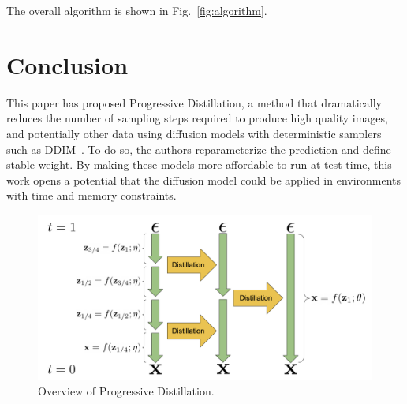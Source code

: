 \documentclass[10pt,twocolumn,letterpaper]{article}
\begin{document}
The overall algorithm is shown in Fig.~\ref{fig:algorithm}.





\section{Conclusion}

This paper has proposed Progressive Distillation, a method that dramatically reduces the number of sampling steps required to produce high quality images, and potentially other data using diffusion models with deterministic samplers such as DDIM~\cite{ddim}.
To do so, the authors reparameterize the prediction and define stable weight.
By making these models more affordable to run at test time, this work opens a potential that the diffusion model could be applied in environments with time and memory constraints.




\begin{figure}[t]
    \includegraphics[width=\linewidth]{assets/overview.png}
    \caption{\label{fig:overview}Overview of Progressive Distillation.}
\end{figure}
\end{document}
